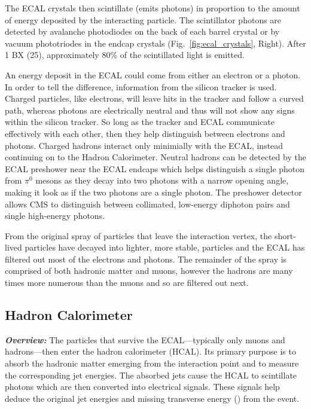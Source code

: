 The ECAL crystals then scintillate (emits photons) in proportion to the amount of energy deposited by the interacting particle. 
The scintillator photons are detected by avalanche photodiodes on the back of each barrel crystal or by vacuum phototriodes in the endcap crystals (Fig.~\ref{fig:ecal_crystals}, Right).
After 1 BX (25\ns), approximately 80\% of the scintillated light is emitted.

An energy deposit in the ECAL could come from either an electron or a photon.
In order to tell the difference, information from the silicon tracker is used.
Charged particles, like electrons, will leave hits in the tracker and follow a curved path, whereas photons are electrically neutral and thus will not show any signs within the silicon tracker.
So long as the tracker and ECAL communicate effectively with each other, then they help distinguish between electrons and photons.
Charged hadrons interact only minimially with the ECAL, instead continuing on to the Hadron Calorimeter.
Neutral hadrons can be detected by the ECAL preshower near the ECAL endcaps which helps distinguish a single photon from $\pi^{0}$ mesons as they decay into two photons with a narrow opening angle, making it look as if the two photons are a single photon.
The preshower detector allows CMS to distinguish between collimated, low-energy diphoton pairs and single high-energy photons.

From the original spray of particles that leave the interaction vertex, the short-lived particles have decayed into lighter, more stable, particles and the ECAL has filtered out most of the electrons and photons.
The remainder of the spray is comprised of both hadronic matter and muons, however the hadrons are many times more numerous than the muons and so are filtered out next.

\subsection{Hadron Calorimeter}
\label{sec:hcal}

\textit{\textbf{Overview:}}
The particles that survive the ECAL---typically only muons and hadrons---then enter the hadron calorimeter (HCAL).
Its primary purpose is to absorb the hadronic matter emerging from the interaction point and to measure the corresponding jet energies.
The absorbed jets cause the HCAL to scintillate photons which are then converted into electrical signals.
These signals help deduce the original jet energies and missing transverse energy (\MET) from the event.

